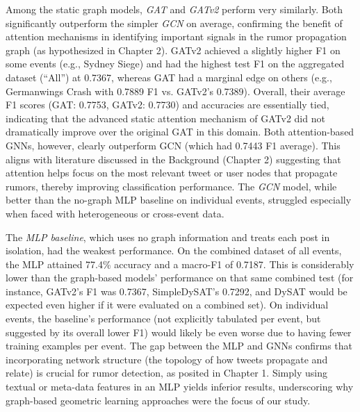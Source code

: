 \documentclass{cshonours}
\begin{document}
Among the static graph models, \emph{GAT} and \emph{GATv2} perform very similarly. Both significantly outperform the simpler \emph{GCN} on average, confirming the benefit of attention mechanisms in identifying important signals in the rumor propagation graph (as hypothesized in Chapter 2). GATv2 achieved a slightly higher F1 on some events (e.g., Sydney Siege) and had the highest test F1 on the aggregated dataset (``All'') at 0.7367, whereas GAT had a marginal edge on others (e.g., Germanwings Crash with 0.7889 F1 vs. GATv2's 0.7389). Overall, their average F1 scores (GAT: 0.7753, GATv2: 0.7730) and accuracies are essentially tied, indicating that the advanced static attention mechanism of GATv2 did not dramatically improve over the original GAT in this domain. Both attention-based GNNs, however, clearly outperform GCN (which had 0.7443 F1 average). This aligns with literature discussed in the Background (Chapter 2) suggesting that attention helps focus on the most relevant tweet or user nodes that propagate rumors, thereby improving classification performance. The \emph{GCN} model, while better than the no-graph MLP baseline on individual events, struggled especially when faced with heterogeneous or cross-event data. 



The \emph{MLP baseline}, which uses no graph information and treats each post in isolation, had the weakest performance. On the combined dataset of all events, the MLP attained 77.4\% accuracy and a macro-F1 of 0.7187. This is considerably lower than the graph-based models' performance on that same combined test (for instance, GATv2's F1 was 0.7367, SimpleDySAT's 0.7292, and DySAT would be expected even higher if it were evaluated on a combined set). On individual events, the baseline's performance (not explicitly tabulated per event, but suggested by its overall lower F1) would likely be even worse due to having fewer training examples per event. The gap between the MLP and GNNs confirms that incorporating network structure (the topology of how tweets propagate and relate) is crucial for rumor detection, as posited in Chapter 1. Simply using textual or meta-data features in an MLP yields inferior results, underscoring why graph-based geometric learning approaches were the focus of our study.
\end{document}
